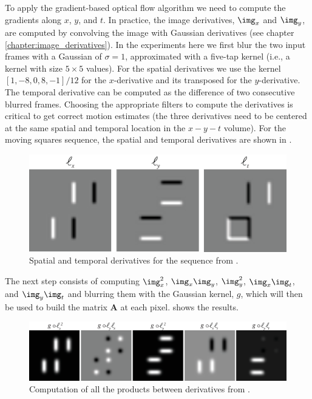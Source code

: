 To apply the gradient-based optical flow algorithm we need to compute the gradients along $x$, $y$, and $t$. In practice, the image derivatives, $\img_x$ and $\img_y$, are computed by convolving the image with Gaussian derivatives (see chapter \ref{chapter:image_derivatives}). In the experiments here we first blur the two input frames with a Gaussian of $\sigma=1$, approximated with a five-tap kernel (i.e., a kernel with size $5 \times 5$ values). For the spatial derivatives we use the kernel $[1, -8, 0, 8, -1]/12$ for the $x$-derivative and its transposed for the $y$-derivative. The temporal derivative can be computed as the difference of two consecutive blurred frames. Choosing the appropriate filters to compute the derivatives is critical to get correct motion estimates (the three derivatives need to be centered at the same spatial and temporal location in the $x-y-t$ volume). For the moving squares sequence, the spatial and temporal derivatives are shown in \fig{\ref{fig:square_grandient_based_2}}.
\vspace{-0.2in}
\begin{figure}[h!]
\centerline{
\includegraphics[width=.7\linewidth]{figures/optical_flow/square_grandient_based_2.eps}}
\caption{Spatial and temporal derivatives for the sequence from \fig{\ref{fig:square_grandient_based_1}}.}
\label{fig:square_grandient_based_2}
\end{figure}
\vspace{-0.2in}

The next step consists of computing $\img_x^2$, $\img_x\img_y$, $\img_y^2$, $\img_x\img_t$, and $\img_y\img_t$ and blurring them with the Gaussian kernel, $g$, which will then be used to build the matrix $\mathbf{A}$ at each pixel. \Fig{\ref{fig:square_grandient_based_3}} shows the results. 
\begin{figure}[h!]
\centerline{
\includegraphics[width=1\linewidth]{figures/optical_flow/square_grandient_based_3.eps}}
\caption{Computation of all the products between derivatives from \fig{\ref{fig:square_grandient_based_2}}.}
\label{fig:square_grandient_based_3}
\end{figure}


